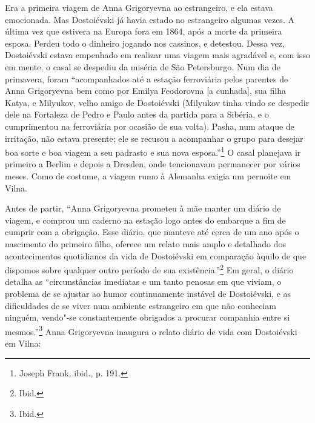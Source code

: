 Era a primeira viagem de Anna Grigoryevna ao estrangeiro, e ela estava
emocionada. Mas Dostoiévski já havia estado no estrangeiro algumas
vezes. A última vez que estivera na Europa fora em 1864, após a morte da
primeira esposa. Perdeu todo o dinheiro jogando nos cassinos, e
detestou. Dessa vez, Dostoiévski estava empenhado em realizar uma viagem
mais agradável e, com isso em mente, o casal se despediu da miséria de
São Petersburgo. Num dia de primavera, foram ``acompanhados até a
estação ferroviária pelos parentes de Anna Grigoryevna bem como por
Emilya Feodorovna {[}a cunhada{]}, sua filha Katya, e Milyukov, velho
amigo de Dostoiévski (Milyukov tinha vindo se despedir dele na Fortaleza
de Pedro e Paulo antes da partida para a Sibéria, e o cumprimentou na
ferroviária por ocasião de sua volta). Pasha, num ataque de irritação,
não estava presente; ele se recusou a acompanhar o grupo para desejar
boa sorte e boa viagem a seu padrasto e sua nova esposa.''\footnote{Joseph Frank, ibid., p. 191.} O casal planejava ir primeiro a Berlim e depois a Dresden, onde tencionavam permanecer por vários meses. Como de
costume, a viagem rumo à Alemanha exigia um pernoite em Vilna.

Antes de partir, ``Anna Grigoryevna prometeu à mãe manter um diário de
viagem, e comprou um caderno na estação logo antes do embarque a fim de
cumprir com a obrigação. Esse diário, que manteve até cerca de um ano
após o nascimento do primeiro filho, oferece um relato mais amplo e
detalhado dos acontecimentos quotidianos da vida de Dostoiévski em
comparação àquilo de que dispomos sobre qualquer outro período de sua
existência.''\footnote{Ibid.} Em geral, o diário detalha as
``circunstâncias imediatas e um tanto penosas em que viviam, o problema
de se ajustar ao humor continuamente instável de Dostoiévski, e as
dificuldades de se viver num ambiente estrangeiro em que não conheciam
ninguém, vendo"-se constantemente obrigados a procurar companhia entre si
mesmos.''\footnote{Ibid.} Anna Grigoryevna inaugura o relato diário de
vida com Dostoiévski em Vilna:

